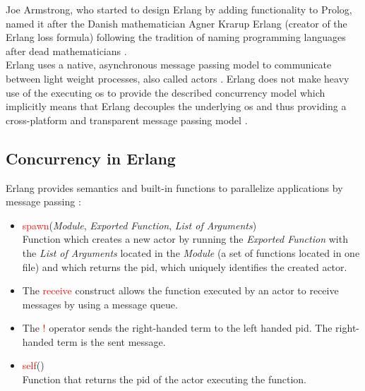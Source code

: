 \documentclass[xcolor=dvipsnames]{article}
\begin{document}
\noindent Joe Armstrong, who started to design Erlang by adding functionality to Prolog, named it after the Danish mathematician Agner Krarup Erlang (creator of the Erlang loss formula) following the tradition of naming programming languages after dead mathematicians \cite[chap. 4.1 on p. 13]{erl_history}.\\

\noindent Erlang uses a native, asynchronous message passing model to communicate between light weight processes, also called actors \cite[chap. 1 on p. 1]{Armstrong96erlang}. Erlang does not make heavy use of the executing \gls{os} to provide the described concurrency model which implicitly means that Erlang decouples the underlying \gls{os} and thus providing a cross-platform and transparent message passing model \cite[chap. 1  \& 3 on p. 1 - 3]{Armstrong96erlang}.

\subsection{Concurrency in Erlang}

\noindent Erlang provides semantics and built-in functions to parallelize  applications by message passing \cite[ch. 4.3 on p. 95 - 104]{erl_doc}:

\begin{itemize}

\item \textcolor{red}{spawn}(\textit{Module}, \textit{Exported Function}, \textit{List of Arguments})\\
Function which creates a new actor by running the \textit{Exported Function} with the \textit{List of Arguments} located in the \textit{Module} (a set of functions located in one file) and which returns the \gls{pid}, which uniquely identifies the created actor.\\

\item The \textcolor{red}{receive} construct allows the function executed by an actor to receive messages by using a message queue.

\item The \textcolor{red}{!} operator sends the right-handed term to the left handed \gls{pid}. The right-handed term is the sent message.

\item \textcolor{red}{self}() \\
Function that returns the \gls{pid} of the actor executing the function.

\end{itemize}
\end{document}
